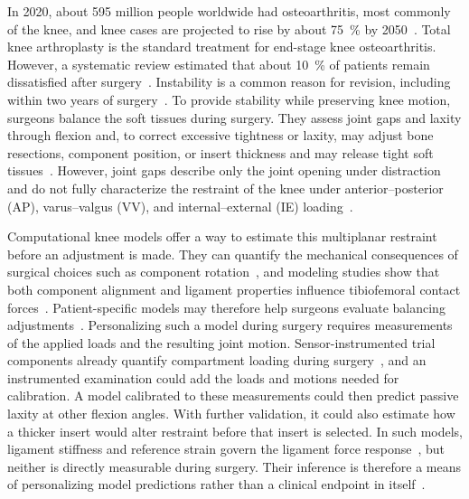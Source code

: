 In 2020, about 595 million people worldwide had osteoarthritis, most commonly of the knee, and knee cases are projected to rise by about \SI{75}{\percent} by 2050~\autocite{gbd2023osteoarthritis}.
Total knee arthroplasty is the standard treatment for end-stage knee osteoarthritis.
However, a systematic review estimated that about \SI{10}{\percent} of patients remain dissatisfied after surgery~\autocite{defrance2023dissatisfied}.
Instability is a common reason for revision, including within two years of surgery~\autocite{brown2022evolving,athwal2014clinical}.
To provide stability while preserving knee motion, surgeons balance the soft tissues during surgery.
They assess joint gaps and laxity through flexion and, to correct excessive tightness or laxity, may adjust bone resections, component position, or insert thickness and may release tight soft tissues~\autocite{daines2014gap,sheth2017surgical}.
However, joint gaps describe only the joint opening under distraction and do not fully characterize the restraint of the knee under anterior--posterior (AP), varus--valgus (VV), and internal--external (IE) loading~\autocite{markolf1976stiffness,athwal2014clinical}.

Computational knee models offer a way to estimate this multiplanar restraint before an adjustment is made.
They can quantify the mechanical consequences of surgical choices such as component rotation~\autocite{thompson2011biomechanical}, and modeling studies show that both component alignment and ligament properties influence tibiofemoral contact forces~\autocite{smith2016influence}.
Patient-specific models may therefore help surgeons evaluate balancing adjustments~\autocite{amiri2012computational}.
Personalizing such a model during surgery requires measurements of the applied loads and the resulting joint motion.
Sensor-instrumented trial components already quantify compartment loading during surgery~\autocite{gustke2014increased}, and an instrumented examination could add the loads and motions needed for calibration.
A model calibrated to these measurements could then predict passive laxity at other flexion angles.
With further validation, it could also estimate how a thicker insert would alter restraint before that insert is selected.
In such models, ligament stiffness and reference strain govern the ligament force response~\autocite{blankevoort1991ligament}, but neither is directly measurable during surgery.
Their inference is therefore a means of personalizing model predictions rather than a clinical endpoint in itself~\autocite{ewing2016estimating}.


